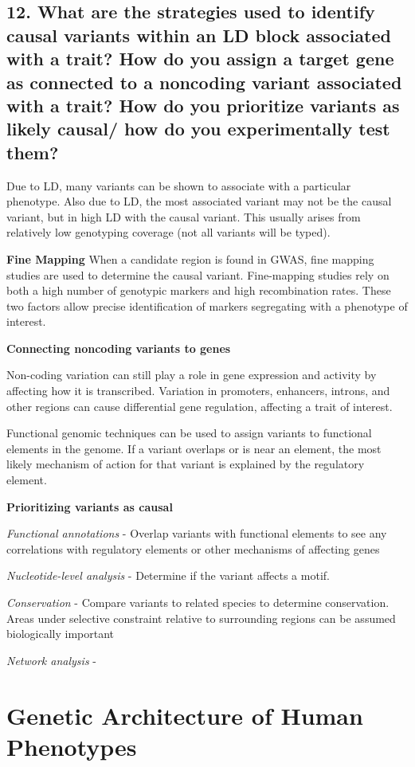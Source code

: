 \documentclass{tufte-handout}
\theoremstyle{noparens}
\begin{document}
\newpage
\subsection{12. What are the strategies used to identify causal variants within an LD block associated with a trait? How do you assign a target gene as connected to a noncoding variant associated with a trait? How do you prioritize variants as likely causal/ how do you experimentally test them?}

Due to LD, many variants can be shown to associate with a particular phenotype. Also due to LD, the most associated variant may not be the causal variant, but in high LD with the causal variant. This usually arises from relatively low genotyping coverage (not all variants will be typed).

\noindent
\textbf{Fine Mapping}
When a candidate region is found in GWAS, fine mapping studies are used to determine the causal variant. Fine-mapping studies rely on both a high number of genotypic markers and high recombination rates. These two factors allow precise identification of markers segregating with a phenotype of interest.

\noindent
\textbf{Connecting noncoding variants to genes}

Non-coding variation can still play a role in gene expression and activity by affecting how it is transcribed. Variation in promoters, enhancers, introns, and other regions can cause differential gene regulation, affecting a trait of interest. 

Functional genomic techniques can be used to assign variants to functional elements in the genome. If a variant overlaps or is near an element, the most likely mechanism of action for that variant is explained by the regulatory element.

\noindent
\textbf{Prioritizing variants as causal}

\emph{Functional annotations} - Overlap variants with functional elements to see any correlations with regulatory elements or other mechanisms of affecting genes

\emph{Nucleotide-level analysis} - Determine if the variant affects a motif.

\emph{Conservation} - Compare variants to related species to determine conservation. Areas under selective constraint relative to surrounding regions can be assumed biologically important

\emph{Network analysis} - 

\newpage
\section{Genetic Architecture of Human Phenotypes}\label{sec:genarch}
\end{document}
